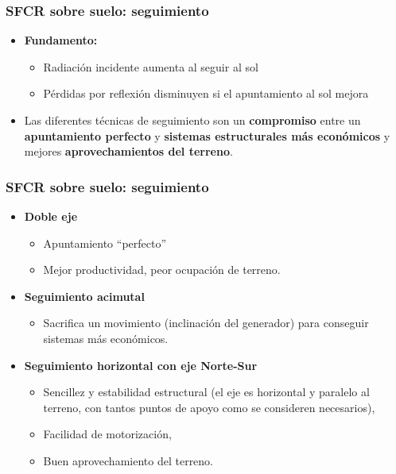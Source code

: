 \documentclass[xcolor=dvipsnames]{beamer}
\begin{document}
\begin{frame}
\frametitle{SFCR sobre suelo: seguimiento}
\begin{itemize}
\item \textbf{Fundamento:}

\begin{itemize}
\item Radiación incidente aumenta al seguir al sol
\item Pérdidas por reflexión disminuyen si el apuntamiento al sol mejora
\end{itemize}
\item Las diferentes técnicas de seguimiento son un \textbf{compromiso}
entre un \textbf{apuntamiento perfecto} y \textbf{sistemas estructurales
más económicos} y mejores \textbf{aprovechamientos del terreno}. 
\end{itemize}

\end{frame}

\begin{frame}
\frametitle{SFCR sobre suelo: seguimiento}
\begin{itemize}
\item \textbf{Doble eje}

\begin{itemize}
\item Apuntamiento {}``perfecto''
\item Mejor productividad, peor ocupación de terreno. 
\end{itemize}
\item \textbf{Seguimiento acimutal}

\begin{itemize}
\item Sacrifica un movimiento (inclinación del generador) para conseguir
sistemas más económicos. 
\end{itemize}
\item \textbf{Seguimiento horizontal con eje Norte-Sur}

\begin{itemize}
\item Sencillez y estabilidad estructural (el eje es horizontal y paralelo
al terreno, con tantos puntos de apoyo como se consideren necesarios), 
\item Facilidad de motorización, 
\item Buen aprovechamiento del terreno.
\end{itemize}
\end{itemize}

\end{frame}
\end{document}
